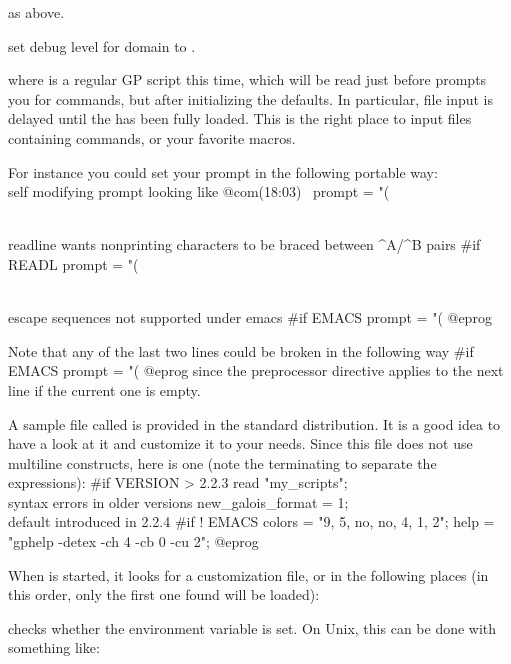\item {} as above.

\item {} set debug level for domain
 to .

\item {} where 
is a regular GP script this time, which will be read just before 
prompts you for commands, but after initializing the defaults. In particular,
file input is delayed until the  has been fully loaded. This is the
right place to input files containing  commands, or your favorite
macros.

\noindent For instance you could set your prompt in the following portable way:
\bprog
\\ self modifying prompt looking like @com\hbox{\rm(18:03) \kbd{ >}}
prompt   = "(%

\\ readline wants nonprinting characters to be braced between ^A/^B pairs
#if READL prompt = "(%

\\ escape sequences not supported under emacs
#if EMACS prompt = "(%
@eprog

\noindent Note that any of the last two lines could be broken in the
following way
\bprog
#if EMACS
  prompt = "(%
@eprog
\noindent since the preprocessor directive applies to the next line if the
current one is empty.

A sample  file called  is provided in the
standard distribution. It is a good idea to have a look at it and customize
it to your needs. Since this file does not use multiline constructs, here is
one (note the terminating \kbd{;} to separate the expressions):
\bprog
#if VERSION > 2.2.3
{
  read "my_scripts";     \\ syntax errors in older versions
  new_galois_format = 1; \\ default introduced in 2.2.4
}
#if ! EMACS
{
  colors = "9, 5, no, no, 4, 1, 2";
  help   = "gphelp -detex -ch 4 -cb 0 -cu 2";
}
@eprog

When  is started, it looks for a customization file, or  in
the following places (in this order, only the first one found will be
loaded):

\noindent\item {} checks whether the environment variable
 is set. On Unix, this can be done with something like: \smallskip

